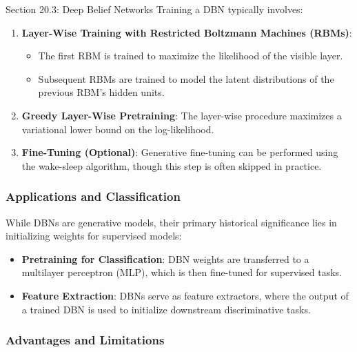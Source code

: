 \begin{notes}{Section 20.3: Deep Belief Networks}
    Training a DBN typically involves:
    \begin{enumerate}
        \item \textbf{Layer-Wise Training with Restricted Boltzmann Machines (RBMs)}:
            \begin{itemize}
                \item The first RBM is trained to maximize the likelihood of the visible layer.
                \item Subsequent RBMs are trained to model the latent distributions of the previous RBM's hidden units.
            \end{itemize}
        \item \textbf{Greedy Layer-Wise Pretraining}: The layer-wise procedure maximizes a variational lower bound on the log-likelihood.
        \item \textbf{Fine-Tuning (Optional)}: Generative fine-tuning can be performed using the wake-sleep algorithm, though this step is often skipped in practice.
    \end{enumerate}
    
    \subsubsection*{Applications and Classification}
    
    While DBNs are generative models, their primary historical significance lies in initializing weights for supervised models:
    \begin{itemize}
        \item \textbf{Pretraining for Classification}: DBN weights are transferred to a multilayer perceptron (MLP), which is then fine-tuned for supervised tasks.
        \item \textbf{Feature Extraction}: DBNs serve as feature extractors, where the output of a trained DBN is used to initialize downstream discriminative tasks.
    \end{itemize}
    
    \subsubsection*{Advantages and Limitations}
    

\end{notes}
